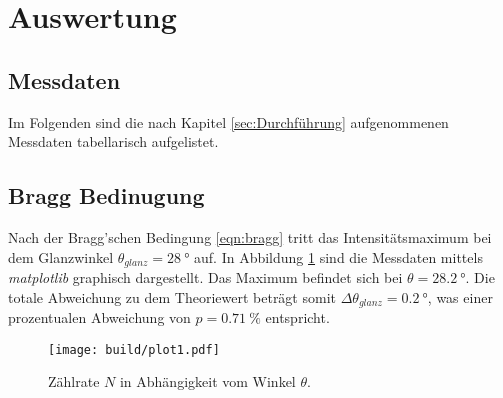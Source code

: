 \section{Auswertung}
\label{sec:Auswertung}
\subsection{Messdaten}
Im Folgenden sind die nach Kapitel \ref{sec:Durchführung} aufgenommenen Messdaten tabellarisch aufgelistet.



\subsection{Bragg Bedinugung}
\label{sec:brag}
Nach der Bragg'schen Bedingung \eqref{eqn:bragg} tritt das Intensitätsmaximum bei dem Glanzwinkel $\theta_{glanz}=\SI{28}{\degree}$ auf.
In Abbildung \ref{fig:plot1} sind die Messdaten mittels \textit{matplotlib} \cite{matplotlib} graphisch dargestellt. Das Maximum befindet
sich bei $\theta=\SI{28.2}{\degree}$. Die totale Abweichung zu dem Theoriewert beträgt somit $\Delta\theta_{glanz}=\SI{0.2}{\degree}$,
was einer prozentualen Abweichung von $p=\SI{0.71}{\percent}$ entspricht.
\begin{figure}[H]
    \centering
    \texttt{[image: build/plot1.pdf]}
    \caption{Zählrate $N$ in Abhängigkeit vom Winkel $\theta$.}
    \label{fig:plot1}
\end{figure}

